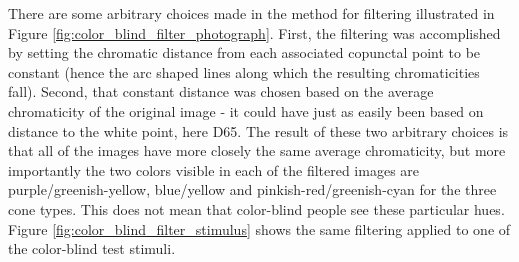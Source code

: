 \documentclass{article}
\begin{document}
\begin{multicols}{2}
There are some arbitrary choices made in the method for filtering illustrated in Figure \ref{fig:color_blind_filter_photograph}.  First, the filtering was accomplished by setting the chromatic distance from each associated copunctal point to be constant (hence the arc shaped lines along which the resulting chromaticities fall).  Second, that constant distance was chosen based on the average chromaticity of the original image - it could have just as easily been based on distance to the white point, here D65.  The result of these two arbitrary choices is that all of the images have more closely the same average chromaticity, but more importantly the two colors visible in each of the filtered images are purple/greenish-yellow, blue/yellow and pinkish-red/greenish-cyan for the three cone types.  This does not mean that color-blind people see these particular hues.  Figure \ref{fig:color_blind_filter_stimulus} shows the same filtering applied to one of the color-blind test stimuli.


\end{multicols}
\end{document}
